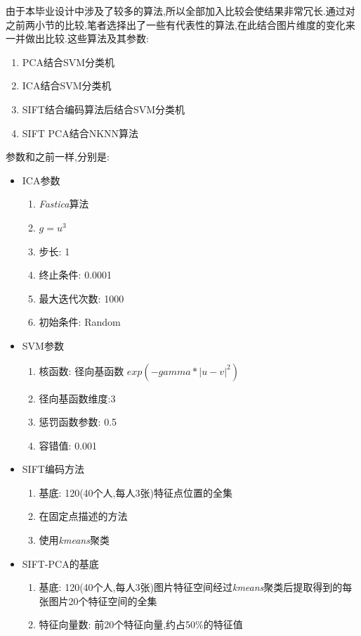 由于本毕业设计中涉及了较多的算法,所以全部加入比较会使结果非常冗长.通过对之前两小节的比较,笔者选择出了一些有代表性的算法,在此结合图片维度的变化来一并做出比较.这些算法及其参数:
\begin{enumerate}
	\item PCA结合SVM分类机
	\item ICA结合SVM分类机
	\item SIFT结合编码算法后结合SVM分类机
	\item SIFT PCA结合NKNN算法
\end{enumerate}
参数和之前一样,分别是:
\begin{itemize}
		\item ICA参数 \begin{enumerate}
		\item \textit{Fastica}算法
		\item $g = u^3$
		\item 步长: 1
		\item 终止条件: 0.0001
		\item 最大迭代次数: 1000
		\item 初始条件: Random	\end{enumerate}
		
	\item SVM参数 \begin{enumerate}
	\item 核函数: 径向基函数 $exp(-gamma*|u-v|^2)$
		\item 径向基函数维度:3
		\item 惩罚函数参数: 0.5
		\item 容错值: 0.001	\end{enumerate}
		
			\item SIFT编码方法 \begin{enumerate}
\item 基底: 120(40个人,每人3张)特征点位置的全集
	\item 在固定点描述的方法
	\item 使用\textit{kmeans}聚类	\end{enumerate}
	
	\item SIFT-PCA的基底 \begin{enumerate}
	\item 基底: 120(40个人,每人3张)图片特征空间经过\textit{kmeans}聚类后提取得到的每张图片20个特征空间的全集
	\item 特征向量数: 前20个特征向量,约占50\%的特征值
	\end{enumerate}
	
\end{itemize}
